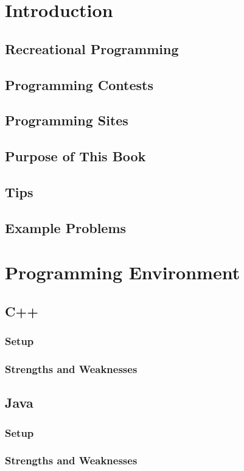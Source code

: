 \documentclass[12pt]{article}
\begin{document}
\section{Introduction}
\subsection{Recreational Programming}
\subsection{Programming Contests}
\subsection{Programming Sites}
\subsection{Purpose of This Book}
\subsection{Tips}
\subsection{Example Problems}

\section{Programming Environment}
\subsection{C++}
\subsubsection{Setup}
\subsubsection{Strengths and Weaknesses}
\subsection{Java}
\subsubsection{Setup}
\subsubsection{Strengths and Weaknesses}
\end{document}
